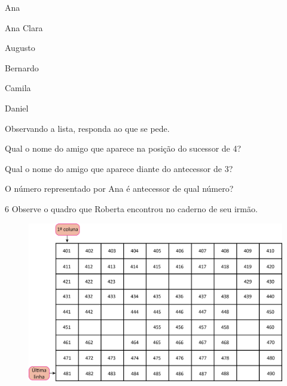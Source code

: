 \begin{myquote}
\begin{enumerate}
\begin{multicols}{2}
\item Ana

\item Ana Clara

\item Augusto

\item Bernardo

\item Camila

\item Daniel
\end{multicols}
\end{enumerate}
\end{myquote}

Observando a lista, responda ao que se pede.

\begin{escolha}
\item Qual o nome do amigo que aparece na posição do sucessor de 4?\\

\item Qual o nome do amigo que aparece diante do antecessor de 3?\\

\item O número representado por Ana é antecessor de qual número?\\
\end{escolha}

\num{6} Observe o quadro que Roberta encontrou no caderno de seu irmão.

\begin{figure}[htpb!]
\includegraphics[width=\textwidth]{./media/image30.png}
\end{figure}

